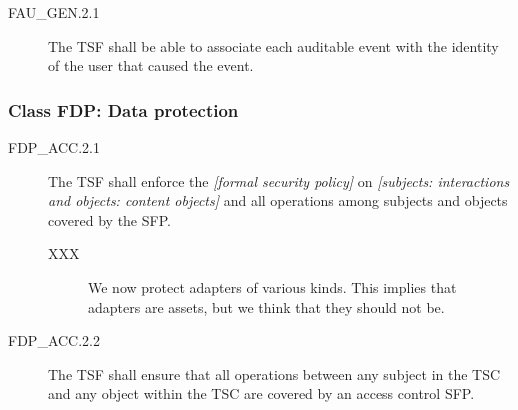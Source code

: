 \documentclass[12pt,english]{scrbook}
\begin{document}
\begin{description}
\item[FAU{\_}GEN.2.1]

The TSF shall be able to associate each auditable event with the identity
of the user that caused the event.

\end{description}





\subsubsection{Class FDP: Data protection}





\begin{description}
\item[FDP{\_}ACC.2.1 ]

The TSF shall enforce the \emph{{[}formal security policy]} on
\emph{{[}subjects: interactions and objects: content objects]} and all
operations among subjects and objects covered by the SFP.
\begin{description}
\item[XXX]

We now protect adapters of various kinds. This implies that
adapters are assets, but we think that they should not be.

\end{description}

\item[FDP{\_}ACC.2.2]

The TSF shall ensure that all operations between any
subject in the TSC and any object within the TSC are covered by an
access control SFP.

\end{description}
\end{document}

